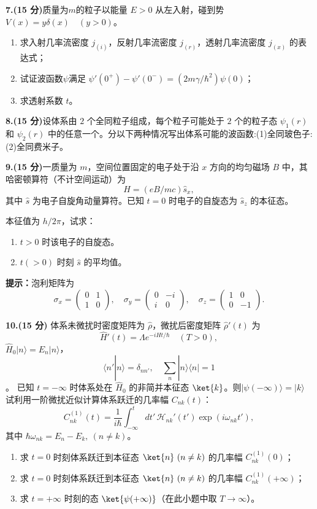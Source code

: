 \textbf{7.(15 分)}质量为$m$的粒子以能量 $E > 0$ 从左入射，碰到势 $V(x) = y\delta(x) \quad (y > 0)$。

\begin{enumerate}
    \item 求入射几率流密度 $j_(i)$，反射几率流密度 $j_(r)$，透射几率流密度 $j_(x)$ 的表达式；
    \item 试证波函数$\psi$满足 $\psi'(0^+) - \psi'(0^-) = \left(2m\gamma/\hbar^2\right) \psi(0)$；
    \item 求透射系数 $t$。
\end{enumerate}

\textbf{8.(15 分)}设体系由 $2$ 个全同粒子组成，每个粒子可能处于 $2$ 个的粒子态 $\psi_1(r)$ 和 $\psi_2(r)$ 中的任意一个。分以下两种情况写出体系可能的波函数:(1)全同玻色子:(2)全同费米子。

\textbf{9.(15 分)}一质量为 $m$，空间位置固定的电子处于沿 $x$ 方向的均匀磁场 $B$ 中，其哈密顿算符（不计空间运动）为
$$H = \left( eB/mc \right) \hat{s}_x,~$$
其中 $\hat{s}$ 为电子自旋角动量算符。已知 $t = 0$ 时电子的自旋态为 $\hat{s}_z$ 的本征态。

本征值为 $h/2\pi$，试求：
\begin{enumerate}
    \item $t > 0$ 时该电子的自旋态。
    \item $t(> 0)$ 时刻 $\hat{s}$ 的平均值。
\end{enumerate}

\textbf{提示：}泡利矩阵为
$$\sigma_x = \begin{pmatrix} 0 & 1 \\ 1 & 0 \end{pmatrix}, \quad \sigma_y = \begin{pmatrix} 0 & -i \\ i & 0 \end{pmatrix}, \quad \sigma_z = \begin{pmatrix} 1 & 0 \\ 0 & -1 \end{pmatrix}.~$$

\textbf{10.(15 分)} 体系未微扰时密度矩阵为 $\hat{\rho}$，微扰后密度矩阵 $\hat{\rho}'(t)$ 为
$$\hat{H}'(t) = \Lambda e^{-iHt/\hbar} \quad (T > 0),~$$
$\hat{H}_0 \lvert n \rangle = E_n \lvert n \rangle$，
$$\langle n' | n \rangle = \delta_{nn'}, \quad \sum_n |n\rangle \langle n| = 1~$$。
已知 $t = -\infty$ 时体系处在 $\hat{H}_0$ 的非简并本征态 $\ket{k}$。则$\lvert \psi(-\infty) \rangle = \lvert k \rangle$  试利用一阶微扰近似计算体系跃迁的几率幅 $C_{nk}(t)$： 
$$C_{nk}^{(1)}(t) = \frac{1}{i\hbar} \int_{-\infty}^{t} dt' \, \mathcal{H}_{nk}'(t') \exp(i\omega_{nk}t'),~$$ 其中 $\hbar\omega_{nk} = E_n - E_k, \ (n \neq k)$。
\begin{enumerate}
        \item 求 $t = 0$ 时刻体系跃迁到本征态 $\ket{n} \ (n \neq k) $ 的几率幅 $C_{nk}^{(1)}(0)$；
        \item 求 $t = 0$ 时刻体系跃迁到本征态 $\ket{n} \ (n \neq k)$ 的几率幅 $C_{nk}^{(1)}(+\infty)$；
        \item 求 $t = +\infty$ 时刻的态 $ \ket{\psi(+\infty)} $（在此小题中取 $T \to \infty$）。
    \end{enumerate}